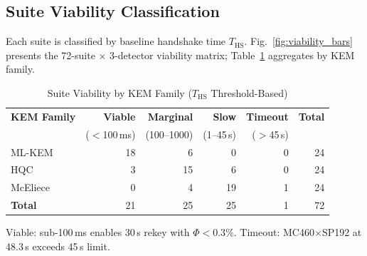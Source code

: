 \subsection{Suite Viability Classification}
\label{sec:viability}

Each suite is classified by baseline handshake time $T_\text{HS}$.
Fig.~\ref{fig:viability_bars} presents the 72-suite $\times$
3-detector viability matrix; Table~\ref{tab:viability_summary}
aggregates by KEM family.

\begin{table}[t]
\centering
\caption{Suite Viability by KEM Family ($T_\text{HS}$ Threshold-Based)}
\label{tab:viability_summary}
\footnotesize
\setlength{\tabcolsep}{3pt}
\begin{tabular}{@{}lrrrrr@{}}
\toprule
\textbf{KEM Family} &
  \textbf{Viable} & \textbf{Marginal} & \textbf{Slow} &
  \textbf{Timeout} & \textbf{Total} \\
& ($<$100\,ms) & (100--1000) & (1--45\,s) & ($>$45\,s) & \\
\midrule
ML-KEM     & 18 & 6  & 0  & 0 & 24 \\
HQC        & 3  & 15 & 6  & 0 & 24 \\
McEliece   & 0  & 4  & 19 & 1 & 24 \\
\midrule
\textbf{Total} & 21 & 25 & 25 & 1 & 72 \\
\bottomrule
\end{tabular}
\begin{tablenotes}
\footnotesize
\item Viable: sub-100\,ms enables 30\,s rekey with $\Phi < 0.3\%$.
  Timeout: MC460$\times$SP192 at 48.3\,s exceeds 45\,s limit.
\end{tablenotes}
\end{table}

